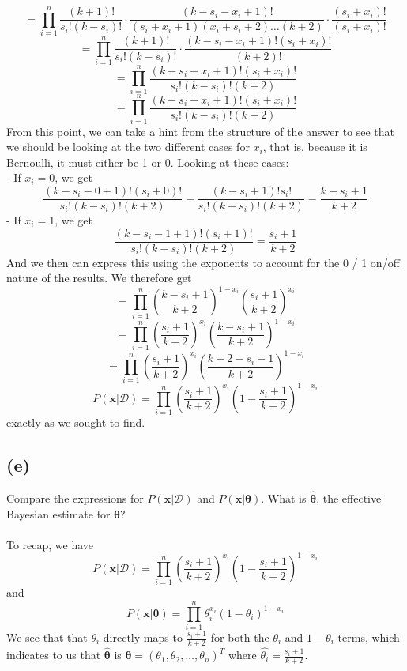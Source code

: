 \documentclass{article}
\begin{document}
{\[\]
\[
  = \prod_{i=1}^{n} \frac{(k+1)!}{s_i!(k - s_i)!} \cdot \frac{(k - s_i - x_i + 1)!}{(s_i + x_i + 1) (x_i + s_i + 2) \dots (k + 2)} \cdot \frac{(s_i + x_i)!}{(s_i + x_i)!}
\]
\[
  = \prod_{i=1}^{n} \frac{(k+1)!}{s_i!(k - s_i)!} \cdot \frac{(k - s_i - x_i + 1)!(s_i + x_i)!}{(k+2)!}
\]
\[
  = \prod_{i=1}^{n} \frac{(k - s_i - x_i + 1)!(s_i + x_i)!}{s_i!(k - s_i)!(k+2)}
\]
\[
  = \prod_{i=1}^{n} \frac{(k - s_i - x_i + 1)!(s_i + x_i)!}{s_i!(k - s_i)!(k+2)}
\]
From this point, we can take a hint from the structure of the answer to see that we should be looking at the two different cases for \(x_i\), that is, because it is Bernoulli, it must either be 1 or 0. Looking at these cases: \\
- If \(x_i = 0\), we get
\[
  \frac{(k - s_i - 0 + 1)!(s_i + 0)!}{s_i!(k - s_i)!(k+2)} = \frac{(k - s_i + 1)!s_i!}{s_i!(k - s_i)!(k+2)} = \frac{k - s_i + 1}{k+2}
\]
- If \(x_i = 1\), we get 
\[
  \frac{(k - s_i - 1 + 1)!(s_i + 1)!}{s_i!(k - s_i)!(k+2)} = \frac{s_i + 1}{k+2}
\]
And we then can express this using the exponents to account for the 0 / 1 on/off nature of the results. We therefore get 
\[
  = \prod_{i=1}^{n} (\frac{k - s_i + 1}{k+2})^{1 - x_i} (\frac{s_i + 1}{k+2})^{x_i}
\]
\[
  = \prod_{i=1}^{n} (\frac{s_i + 1}{k+2})^{x_i} (\frac{k - s_i + 1}{k+2})^{1 - x_i} 
\]
\[
  = \prod_{i=1}^{n} (\frac{s_i + 1}{k+2})^{x_i} (\frac{k + 2 - s_i - 1}{k+2})^{1 - x_i} 
\]
\[
  \boxed{P(\mathbf{x} | \mathcal{D}) = \prod_{i=1}^{n} (\frac{s_i + 1}{k+2})^{x_i} (1 - \frac{s_i + 1}{k+2})^{1 - x_i} }
\]
exactly as we sought to find.

\subsection*{(e)}
Compare the expressions for \(P(\mathbf{x} | \mathcal{D})\) and \(P(\mathbf{x} | \boldsymbol{\theta}).\) What is \(\hat{\boldsymbol{\theta}}\), the effective Bayesian estimate for \(\boldsymbol{\theta}\)? \\ \\
To recap, we have 
\[
  P(\mathbf{x} | \mathcal{D}) = \prod_{i=1}^{n} (\frac{s_i + 1}{k+2})^{x_i} (1 - \frac{s_i + 1}{k+2})^{1 - x_i} 
\]
and 
\[
  P(\mathbf{x} | \boldsymbol{\theta}) = \prod_{i=1}^{n} \theta_i^{x_i} (1 - \theta_i)^{1 - x_i}
\]
We see that that \(\theta_i\) directly maps to \(\frac{s_i + 1}{k + 2}\) for both the \(\theta_i\) and \(1 - \theta_i\) terms, which indicates to us that \(\hat{\boldsymbol{\theta}}\) is \(\boldsymbol{\theta} = (\theta_1, \theta_2, \dots, \theta_n)^T\) where \(\hat{\theta_i} = \frac{s_i + 1}{k + 2}\).

}
\end{document}
